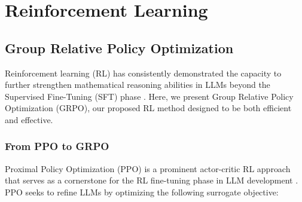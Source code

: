 \section{Reinforcement Learning}

\subsection{Group Relative Policy Optimization} Reinforcement learning (RL) has consistently demonstrated the capacity to further strengthen mathematical reasoning abilities in LLMs beyond the Supervised Fine-Tuning (SFT) phase \citep{wang2023math,wizardmath}. Here, we present Group Relative Policy Optimization (GRPO), our proposed RL method designed to be both efficient and effective.

\subsubsection{From PPO to GRPO} Proximal Policy Optimization (PPO) \citep{schulman2017proximal} is a prominent actor-critic RL approach that serves as a cornerstone for the RL fine-tuning phase in LLM development \citep{ouyang2022training}. PPO seeks to refine LLMs by optimizing the following surrogate objective:

